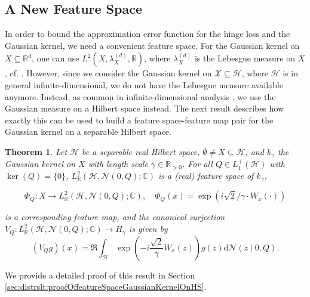 \documentclass[letterpaper]{article} %
\newcommand{\R}{\mathbb{R}}
\newcommand{\Rp}{\R_{> 0}}
\newcommand{\fm}{\Phi} %
\newcommand{\hs}[1]{\mathcal{#1}} %
\newcommand{\inputSet}{\mathcal{X}} %
\newcommand{\hilbertianHS}{\hs{H}} %
\newcommand{\Normal}{\mathcal{N}}
\newcommand{\C}{\mathbb{C}}
\newcommand{\gaussianKernel}[1]{k_{#1}}
\newtheorem{theorem}{Theorem}
\newif\ifTwoColumns
\newif\ifCameraReady
\begin{document}
\subsection{A New Feature Space}
In order to bound the approximation error function for the hinge loss and the Gaussian kernel, we need a convenient feature space.
For the Gaussian kernel on $X\subseteq\R^d$, one can use $L^2(X,\lambda_X^{(d)},\R)$, where $\lambda_X^{(d)}$ is the Lebesgue measure on $X$, cf. \cite[Section~4.4]{SC08}.
However, since we consider the Gaussian kernel on $\inputSet\subseteq\hilbertianHS$, where $\hilbertianHS$ is in general infinite-dimensional, we do not have the Lebesgue measure available anymore.
Instead, as common in infinite-dimensional analysis \cite{daprato2006introduction}, we use the Gaussian measure on a Hilbert space instead.
The next result describes how exactly this can be used to build a feature space-feature map pair for the Gaussian kernel on a separable Hilbert space.
\begin{theorem} \label{thm:distrslt:featureSpaceGaussianKernelOnHS}
Let $\hs{H}$ be a separable real Hilbert space, $\emptyset\not=X\subseteq\hs{H}$, and $\gaussianKernel{\gamma}$ the Gaussian kernel on $X$ with length scale $\gamma\in\Rp$.
For all $Q\in L_1^+(\hs{H})$ with $\ker(Q)=\{0\}$, $L^2_\R(\hs{H},\Normal(0,Q);\C)$ is a (real) feature space of $k_\gamma$,
\ifTwoColumns
$\fm_Q: X \rightarrow L^2_\R(\hs{H},\Normal(0,Q);\C)$ defined by
\begin{equation}
    \fm_Q(x) = \exp(i \sqrt{2}/\gamma \cdot W_x(\cdot))
\end{equation}
\else
\begin{equation}
    \fm_Q: X \rightarrow L^2_\R(\hs{H},\Normal(0,Q);\C),
    \quad
    \fm_Q(x) = \exp(i \sqrt{2}/\gamma \cdot W_x(\cdot))
\end{equation}
\fi
is a corresponding feature map, 
and the canonical surjection $V_Q: L^2_\R(\hs{H},\Normal(0,Q);\C) \rightarrow H_\gamma$ is given by
\begin{equation}
    (V_Qg)(x) = \Re \int_\hs{H} \exp\left(-i \frac{\sqrt{2}}{\gamma} W_x(z)\right)g(z)\mathrm{d}\Normal(z\mid 0, Q).
\end{equation}
\end{theorem}
\ifCameraReady
We provide a detailed proof of this result in the supplementary material.
\else
We provide a detailed proof of this result in Section \ref{sec:distrslt:proofOffeatureSpaceGaussianKernelOnHS}.
\fi
\end{document}

